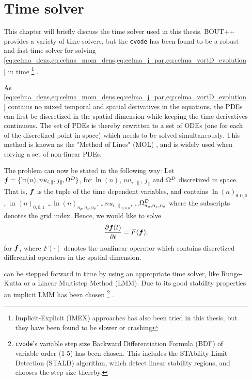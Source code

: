 \section{Time solver}
This chapter will briefly discuss the time solver used in this thesis.
BOUT++ provides a variety of time solvers, but the \texttt{cvode}\cite{Hindmarsh2012book} has been found to be a robust and fast time solver for solving \cref{eq:celma_dens,eq:celma_mom_dens,eq:celma_j_par,eq:celma_vortD_evolution} in time%
\footnote{Implicit-Explicit (IMEX) approaches has also been tried in this thesis, but they have been found to be slower or crashing}
%
.

As \cref{eq:celma_dens,eq:celma_mom_dens,eq:celma_j_par,eq:celma_vortD_evolution} contains no mixed temporal and spatial derivatives in the equations, the PDEs can first be discretized in the spatial dimension while keeping the time derivatives continuous.
The set of PDEs is thereby rewritten to a set of ODEs (one for each of the discretized point in space) which needs to be solved simultaneously.
This method is known as the "Method of Lines" (MOL) \cite{Leveque2007book}, and is widely used when solving a set of non-linear PDEs.

The problem can now be stated in the following way:
Let $\boldsymbol{f} = \{\ln(n), nu_{i,\|}, j_\|, \Omega^D\}$, for $\ln(n)$, $nu_{i,\|}$, $j_\|$ and $\Omega^D$ discretized in space.
That is, $\boldsymbol{f}$ is the tuple of the time dependent variables, and contains $\ln(n)_{0,0,0}$, $\ln(n)_{0,0,1}$ \ldots $\ln(n)_{n_\rho,n_z,n_\theta}$, \ldots $nu_{{i,\|}_{0,0,0}}$, \ldots $\Omega^D_{n_\rho,n_z,n_\theta}$ where the subscripts denotes the grid index.
Hence, we would like to solve
%
\begin{align}
    \frac{\partial {\boldsymbol{f}(t)}}{\partial{t}} = F(\boldsymbol{f}),
    \label{eq:MOL}
\end{align}
%
for $\boldsymbol{f}$, where $F(\cdot)$ denotes the nonlinear operator which contains discretized differential operators in the spatial dimension.

 can be stepped forward in time by using an appropriate time solver, like Runge-Kutta or a Linear Multistep Method (LMM).
Due to its good stability properties \cite{Leveque2007book} an implicit LMM has been chosen%
\footnote{
    \texttt{cvode}'s variable step size Backward Differentiation Formula (BDF) of variable order (1-5) has been chosen.
    This includes the STAbility Limit Detection (STALD) algorithm, which detect linear stability regions, and chooses the step-size thereby.
}
%
.

